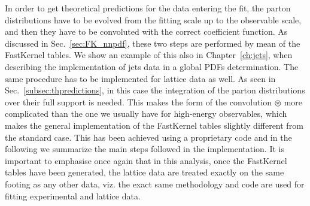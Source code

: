In order to get theoretical predictions for the data entering the fit, 
the parton distributions have to be evolved from the fitting scale up to the observable scale, and then
they have to be convoluted with the correct coefficient function. 
As discussed in Sec.~\ref{sec:FK_nnpdf}, these two steps are performed by mean of the FastKernel tables.
We show an example of this also in Chapter~\ref{ch:jets}, when describing the implementation of jets
data in a global PDFs determination.
%
The same procedure has to be implemented for lattice data as well.
As seen in Sec.~\ref{subsec:thpredictions}, in this case the
integration of the parton distributions over their full support is needed. This
makes the form of the convolution $\circledast$ more complicated than the one we
usually have for high-energy observables, which makes the general implementation of 
the FastKernel tables slightly different from the standard case.
This has been achieved using a proprietary code and in the following we summarize the main steps followed in 
the implementation.
It is important to emphasise once again that in this analysis, once the FastKernel tables have been generated, 
the lattice data are treated exactly on the same footing as any other data, viz. the exact same methodology 
and code are used for fitting experimental and lattice data.

